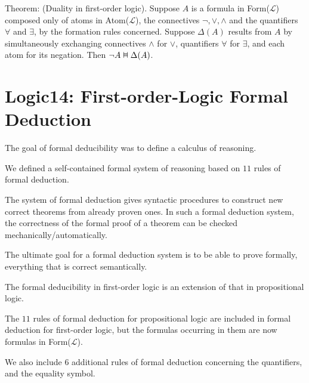 \documentclass{article}
\newcommand{\vDashv}{%
  \mathrel{%
    \text{%
      \ooalign{$\vDash$\cr\reflectbox{$\vDash$}\cr}%
    }%
  }%
}
\begin{document}
Theorem: (Duality in first-order logic). Suppose $A$ is a formula in Form($\mathcal{L}$) composed only of atoms in Atom($\mathcal{L}$), the connectives $\neg, \vee, \wedge$ and the quantifiers $\forall$ and $\exists$, by the formation rules concerned. Suppose $\Delta(A)$ results from $A$ by simultaneously exchanging connectives $\wedge$ for $\vee$, quantifiers $\forall$ for $\exists$, and each atom for its negation. Then $\neg A \vDashv \Delta (A)$.


\section{Logic14: First-order-Logic Formal Deduction}

The goal of formal deducibility was to define a calculus of reasoning.

We defined a self-contained formal system of reasoning based on $11$ rules of formal deduction. 

The system of formal deduction gives syntactic procedures to construct new correct theorems from already proven ones. In such a formal deduction system, the correctness of the formal proof of a theorem can be checked mechanically/automatically.

The ultimate goal for a formal deduction system is to be able to prove formally, everything that is correct semantically.

The formal deducibility in first-order logic is an extension of that in propositional logic.

The $11$ rules of formal deduction for propositional logic are included in formal deduction for first-order logic, but the formulas occurring in them are now formulas in Form($\mathcal{L}$).

We also include $6$ additional rules of formal deduction concerning the quantifiers, and the equality symbol.
\end{document}

